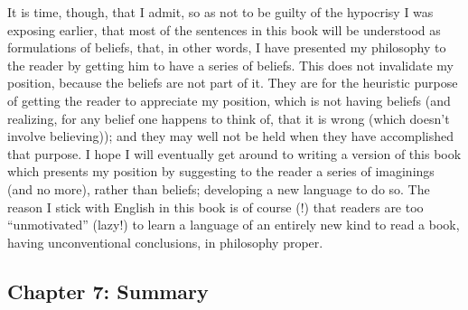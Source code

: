It is time, though, that I admit, so as not to be guilty of the hypocrisy I 
was exposing earlier, that most of the sentences in this book will be 
understood as formulations of beliefs, that, in other words, I have presented 
my philosophy to the reader by getting him to have a series of beliefs. This 
does not invalidate my position, because the beliefs are not part of it. They 
are for the heuristic purpose of getting the reader to appreciate my position, 
which is not having beliefs (and realizing, for any belief one happens to think 
of, that it is wrong (which doesn't involve believing)); and they may well not 
be held when they have accomplished that purpose. I hope I will eventually 
get around to writing a version of this book which presents my position by 
suggesting to the reader a series of imaginings (and no more), rather than 
beliefs; developing a new language to do so. The reason I stick with English 
in this book is of course (!) that readers are too \enquote{unmotivated} (lazy!) to 
learn a language of an entirely new kind to read a book, having 
unconventional conclusions, in philosophy proper. 

\subsection[Chapter 7: Summary][Summary]{Chapter 7: Summary}

